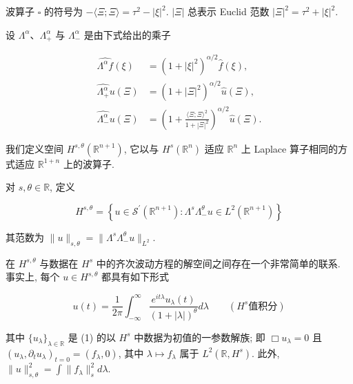 波算子 $\square$ 的符号为 $- \langle \Xi; \Xi\rangle = \tau^{2}-|\xi|^{2}$. $|\Xi|$ 总表示 Euclid 范数 $|\Xi|^{2}=\tau^{2}+|\xi|^{2}$. 

\begin{definition}\label{def:cG-2.8}
设 $\Lambda^{\alpha}$、$\Lambda_{+}^{\alpha}$ 与 $\Lambda_{-}^{\alpha}$ 是由下式给出的乘子

\begin{align*}
\widehat {\Lambda^ {\alpha} f} (\xi) &= \left(1 + | \xi | ^ {2}\right) ^ {\alpha / 2} \widehat {f} (\xi), \\
\widehat {\Lambda_ {+} ^ {\alpha}} u (\Xi) &= \left(1 + | \Xi | ^ {2}\right) ^ {\alpha / 2} \widehat {u} (\Xi), \\
\widehat {\Lambda_ {-} ^ {\alpha}} u (\Xi) &= \left(1 + \frac {\langle \Xi ;  \Xi \rangle ^ {2}}{1 + | \Xi | ^ {2}}\right) ^ {\alpha / 2} \widehat {u} (\Xi).
\end{align*}
\end{definition}

我们定义空间 $H^{s, \theta}(\mathbb{R}^{n + 1})$, 它以与 $H^{s}(\mathbb{R}^{n})$ 适应 $\mathbb{R}^n$ 上 Laplace 算子相同的方式适应 $\mathbb{R}^{1 + n}$ 上的波算子. 

\begin{definition}\label{def:cG-2.9}
对 $s,  \theta \in \mathbb{R}$, 定义

\[
H ^ {s,  \theta} = \left\{u \in \mathcal {S} ^ {\prime} \left(\mathbb {R} ^ {n + 1}\right) : \Lambda^ {s} \Lambda_ {-} ^ {\theta} u \in L ^ {2} \left(\mathbb {R} ^ {n + 1}\right) \right\}
\]

其范数为 $\| u\|_{s, \theta} = \| \Lambda^s\Lambda_-^\theta u\|_{L^2}$. 
\end{definition}

在 $H^{s, \theta}$ 与数据在 $H^{s}$ 中的齐次波动方程的解空间之间存在一个非常简单的联系. 事实上, 每个 $u \in H^{s, \theta}$ 都具有如下形式

\begin{equation}
u (t) = \frac {1}{2 \pi} \int_ {- \infty} ^ {\infty} \frac {e ^ {i t \lambda} u _ {\lambda} (t)}{(1 + | \lambda |) ^ {\theta}} d \lambda \qquad (H ^ {s}\text{值积分})\label{eq:cG-28}
\end{equation}

其中 $\{u_{\lambda}\}_{\lambda \in \mathbb{R}}$ 是 (1) 的以 $H^{s}$ 中数据为初值的一参数解族; 即 $\Box u_{\lambda} = 0$ 且 $(u_{\lambda}, \partial_t u_{\lambda})_{t = 0} = (f_{\lambda}, 0)$, 其中 $\lambda \mapsto f_{\lambda}$ 属于 $L^2 (\mathbb{R}, H^s)$. 此外, $\| u\|_{s, \theta}^2 = \int \| f_\lambda \| _s^2 d\lambda$. 

